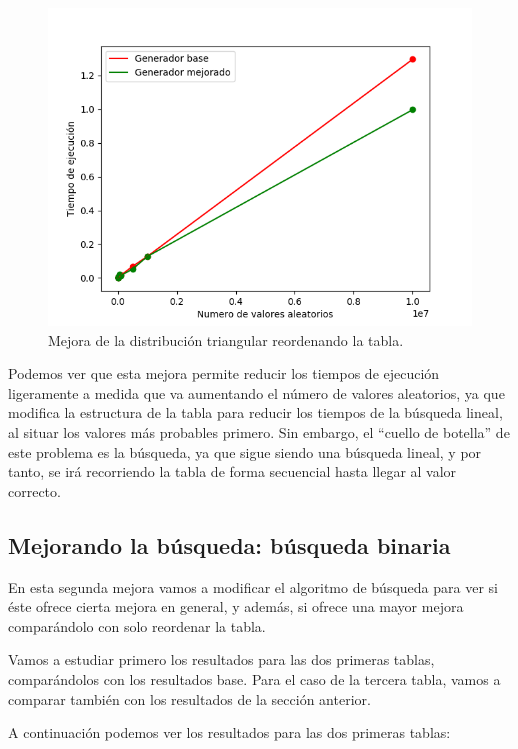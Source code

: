 \documentclass[11pt,a4paper]{report}
\begin{document}
\begin{figure}[H]
\centering
\includegraphics[scale=0.6]{img/mejora1.png}
\caption{Mejora de la distribución triangular reordenando la tabla.}
\label{fig:mejora1}
\end{figure}

Podemos ver que esta mejora permite reducir los tiempos de ejecución ligeramente a medida que va aumentando el número
de valores aleatorios, ya que modifica la estructura de la tabla para reducir los tiempos de la búsqueda lineal, al situar
los valores más probables primero. Sin embargo, el ``cuello de botella'' de este problema es la búsqueda, ya que sigue siendo
una búsqueda lineal, y por tanto, se irá recorriendo la tabla de forma secuencial hasta llegar al valor correcto.

\subsection{Mejorando la búsqueda: búsqueda binaria}

En esta segunda mejora vamos a modificar el algoritmo de búsqueda para ver si éste ofrece cierta mejora en general, y además,
si ofrece una mayor mejora comparándolo con solo reordenar la tabla.

Vamos a estudiar primero los resultados para las dos primeras tablas, comparándolos con los resultados base. Para el caso
de la tercera tabla, vamos a comparar también con los resultados de la sección anterior.

A continuación podemos ver los resultados para las dos primeras tablas:
\end{document}
